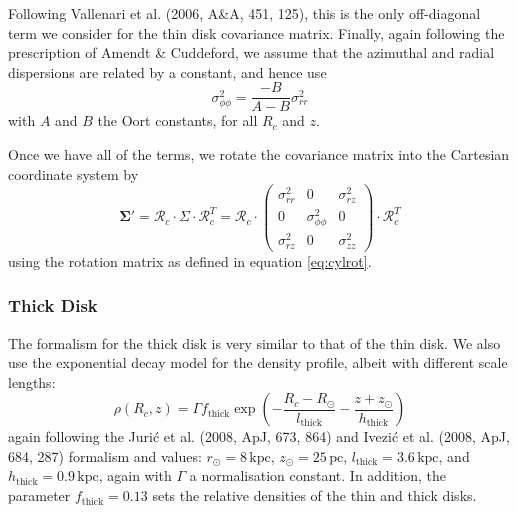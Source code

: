 \documentclass[fleqn,usenatbib]{mnras}
\begin{document}
Following Vallenari et al. (2006, A\&A, 451, 125), this is the only off-diagonal term we consider for the thin disk covariance matrix.
Finally, again following the prescription of Amendt \& Cuddeford, we assume that the azimuthal and radial dispersions are related by a constant, and hence use
\begin{equation}
    \sigma_{\phi\phi}^2 = \frac{-B}{A - B} \sigma_{rr}^2    
\end{equation}
with $A$ and $B$ the Oort constants, for all $R_c$ and $z$.

Once we have all of the terms, we rotate the covariance matrix into the Cartesian coordinate system by
\begin{equation}
    \bm{\Sigma}{'} = \bm{\mathcal{R}}_c \cdot \Sigma \cdot \bm{\mathcal{R}}_c^T = \bm{\mathcal{R}}_c \cdot \left(\begin{matrix} \sigma_{rr}^2 & 0 & \sigma_{rz}^2 \\ 0 & \sigma_{\phi\phi}^2 & 0 \\ \sigma_{rz}^2 & 0 & \sigma_{zz}^2 \end{matrix}\right) \cdot \bm{\mathcal{R}}_c^T
\end{equation}
using the rotation matrix as defined in equation \ref{eq:cylrot}.

\subsubsection{Thick Disk}
The formalism for the thick disk is very similar to that of the thin disk.
We also use the exponential decay model for the density profile, albeit with different scale lengths:
\begin{equation}
    \rho(R_c, z) = \Gamma f_\mathrm{thick}\exp\left(-\frac{R_c - R_\odot}{l_\mathrm{thick}} - \frac{z + z_\odot}{h_\mathrm{thick}}\right)
\end{equation}
again following the Juri\'{c} et al. (2008, ApJ, 673, 864) and Ivezi\'{c} et al. (2008, ApJ, 684, 287) formalism and values: $r_\odot = 8\,\mathrm{kpc}$, $z_\odot = 25\,\mathrm{pc}$, $l_\mathrm{thick} = 3.6\,\mathrm{kpc}$, and $h_\mathrm{thick} = 0.9\,\mathrm{kpc}$, again with $\Gamma$ a normalisation constant.
In addition, the parameter $f_\mathrm{thick} = 0.13$ sets the relative densities of the thin and thick disks.
\end{document}
